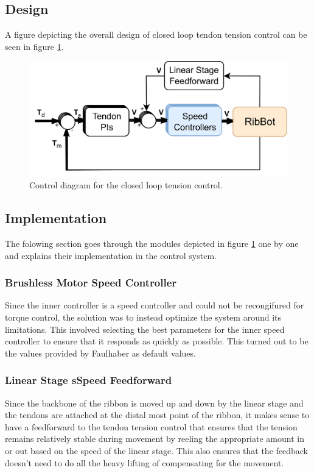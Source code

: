 \subsection{Design}
A figure depicting the overall design of closed loop tendon tension control can be seen in figure \ref{fig:tensioncontrol}.
\begin{figure}
    \centering
    \includegraphics[width=0.7\linewidth]{images/tensioncontrol.png}
    \caption{Control diagram for the closed loop tension control.}
    \label{fig:tensioncontrol}
\end{figure}


\subsection{Implementation}
The folowing section goes through the modules depicted in figure \ref{fig:tensioncontrol} one by one and explains their implementation in the control system.

\subsubsection{Brushless Motor Speed Controller}
Since the inner controller is a speed controller and could not be recongifured for torque control, the solution was to instead optimize the system around its limitations. This involved selecting the best parameters for the inner speed controller to ensure that it responds as quickly as possible. This turned out to be the values provided by Faulhaber as default values. 

\subsubsection{Linear Stage sSpeed Feedforward}
Since the backbone of the ribbon is moved up and down by the linear stage and the tendons are attached at the distal most point of the ribbon, it makes sense to have a feedforward to the tendon tension control that ensures that the tension remains relatively stable during movement by reeling the appropriate amount in or out based on the speed of the linear stage. This also ensures that the feedback doesn't need to do all the heavy lifting of compensating for the movement.

